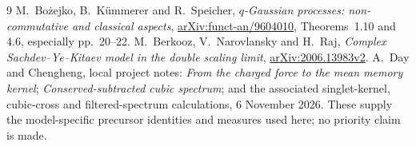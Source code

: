 \documentclass[11pt,a4paper]{article}
\begin{document}
\begin{thebibliography}{9}
 M.~Bo\.{z}ejko, B.~K\"ummerer and R.~Speicher,
\emph{$q$-Gaussian processes: non-commutative and classical aspects},
\href{https://arxiv.org/abs/funct-an/9604010}{arXiv:funct-an/9604010},
Theorems~1.10 and 4.6, especially pp.~20--22.
 M.~Berkooz, V.~Narovlansky and H.~Raj,
\emph{Complex Sachdev--Ye--Kitaev model in the double scaling limit},
\href{https://arxiv.org/abs/2006.13983v2}{arXiv:2006.13983v2}.
 A.~Day and Chengheng, local project notes:
\emph{From the charged force to the mean memory kernel};
\emph{Conserved-subtracted cubic spectrum}; and the associated
singlet-kernel, cubic-cross and filtered-spectrum calculations,
6 November 2026. These supply the model-specific precursor identities
and measures used here; no priority claim is made.
\end{thebibliography}
\end{document}
